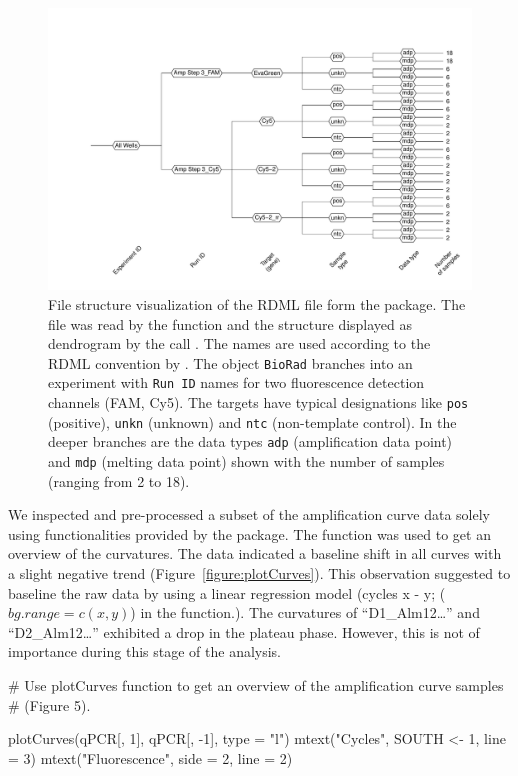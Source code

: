 \begin{figure}[htbp]
  \centering
  \includegraphics[clip=true,trim=4cm 1cm 0.9cm 2.75cm, width=12cm]{figures/RDML_dendrogram.pdf}
  \caption{File structure visualization of the RDML file 
 form the  package. The file was read 
by the  function and the structure displayed as dendrogram by the 
call . The names are used according to the RDML 
convention by \citet{lefever_2009}. The object \texttt{BioRad} branches into an 
experiment with \texttt{Run ID} names for two fluorescence detection channels 
(FAM, Cy5). The targets have typical designations like \texttt{pos} (positive), 
\texttt{unkn} (unknown) and \texttt{ntc} (non-template control). In the deeper 
branches are the data types \texttt{adp} (amplification data point) and 
\texttt{mdp} (melting data point) shown with the number of samples (ranging from 
2 to 18).
} 
\label{figure:RDML_dendrogram}
\end{figure}

We inspected and pre-processed a subset of the amplification curve data solely 
using functionalities provided by the  package. The 
 function was used to get an overview of the curvatures. The 
data indicated a baseline shift in all curves with a slight negative trend 
(Figure~\ref{figure:plotCurves}). This observation suggested to baseline the raw 
data by using a linear regression model (cycles x - y; ($bg.range = c(x, y)$) in 
the  function.). The curvatures of ``D1\_Alm12\ldots'' and 
``D2\_Alm12\ldots'' exhibited a drop in the plateau phase. However, this is not 
of importance during this stage of the analysis.

\begin{example}
# Use plotCurves function to get an overview of the amplification curve samples
# (Figure 5).

plotCurves(qPCR[, 1], qPCR[, -1], type = "l")
mtext("Cycles", SOUTH <- 1, line = 3)
mtext("Fluorescence", side = 2, line = 2)
\end{example}

